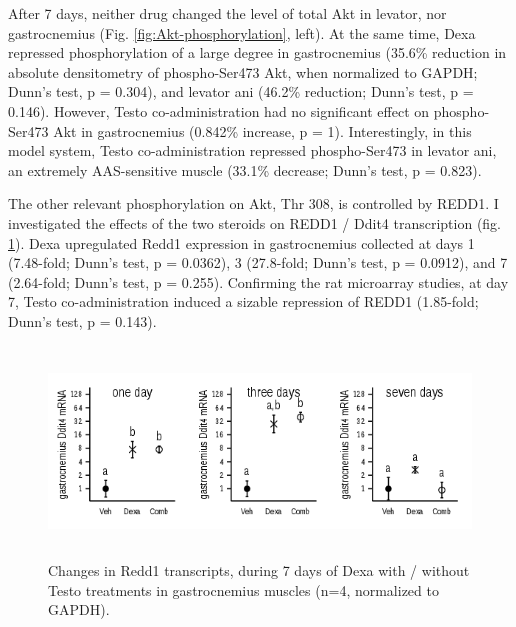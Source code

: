 \documentclass[12pt,english]{report}\usepackage[]{graphicx}\usepackage[]{color}
\newenvironment{knitrout}{}{} %
\begin{document}
After 7 days, neither drug changed the level of total Akt in levator,
nor gastrocnemius (Fig. \ref{fig:Akt-phosphorylation}, left). At
the same time, Dexa repressed phosphorylation of a large degree in
gastrocnemius (35.6\%
reduction in absolute densitometry of phospho-Ser473 Akt, when normalized
to GAPDH; Dunn's test, p = 0.304),
and levator ani (46.2\%
reduction; Dunn's test, p = 0.146).
However, Testo co-administration had no significant effect on phospho-Ser473
Akt in gastrocnemius (0.842\%
increase, p = 1).
Interestingly, in this model system, Testo co-administration repressed
phospho-Ser473 in levator ani, an extremely AAS-sensitive muscle (33.1\%
decrease; Dunn's test, p = 0.823).

The other relevant phosphorylation on Akt, Thr 308, is controlled
by REDD1. I investigated the effects of the two steroids on REDD1
/ Ddit4 transcription (fig. \ref{fig:Redd1-expression}). Dexa upregulated
Redd1 expression in gastrocnemius collected at days 1 (7.48-fold;
Dunn's test, p = 0.0362),
3 (27.8-fold;
Dunn's test, p = 0.0912),
and 7 (2.64-fold;
Dunn's test, p = 0.255).
Confirming the rat microarray studies, at day 7, Testo co-administration
induced a sizable repression of REDD1 (1.85-fold;
Dunn's test, p = 0.143).

\begin{figure}
\begin{knitrout}
\color{fgcolor}
\includegraphics[width=6in,height=2.2in]{figure/redd-1} 

\end{knitrout}

\protect\caption[Changes in the expression of Redd1 during Dexa with / without Testo
treatments.]{Changes in Redd1 transcripts, during 7 days of Dexa with / without
Testo treatments in gastrocnemius muscles (n=4, normalized to GAPDH).\label{fig:Redd1-expression}}
\end{figure}
\end{document}
